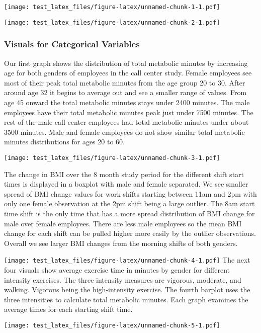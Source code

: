 \documentclass[]{article}
\begin{document}
\texttt{[image: test\_latex\_files/figure-latex/unnamed-chunk-1-1.pdf]}

\texttt{[image: test\_latex\_files/figure-latex/unnamed-chunk-2-1.pdf]}

\hypertarget{visuals-for-categorical-variables}{%
\subsubsection{Visuals for Categorical
Variables}\label{visuals-for-categorical-variables}}

Our first graph shows the distribution of total metabolic minutes by
increasing age for both genders of employees in the call center study.
Female employees see most of their peak total metabolic minutes from the
age group 20 to 30. After around age 32 it begins to average out and see
a smaller range of values. From age 45 onward the total metabolic
minutes stays under 2400 minutes. The male employees have their total
metabolic minutes peak just under 7500 minutes. The rest of the male
call center employees had total metabolic minutes under about 3500
minutes. Male and female employees do not show similar total metabolic
minutes distributions for ages 20 to 60.

\texttt{[image: test\_latex\_files/figure-latex/unnamed-chunk-3-1.pdf]}

The change in BMI over the 8 month study period for the different shift
start times is displayed in a boxplot with male and female separated. We
see smaller spread of BMI change values for work shifts starting between
11am and 2pm with only one female observation at the 2pm shift being a
large outlier. The 8am start time shift is the only time that has a more
spread distribution of BMI change for male over female employees. There
are less male employees so the mean BMI change for each shift can be
pulled higher more easily by the outlier observations. Overall we see
larger BMI changes from the morning shifts of both genders.

\texttt{[image: test\_latex\_files/figure-latex/unnamed-chunk-4-1.pdf]}
The next four visuals show average exercise time in minutes by gender
for different intensity exercises. The three intensity measures are
vigorous, moderate, and walking. Vigorous being the high-intensity
exercise. The fourth barplot uses the three intensities to calculate
total metabolic minutes. Each graph examines the average times for each
starting shift time.

\texttt{[image: test\_latex\_files/figure-latex/unnamed-chunk-5-1.pdf]}
\end{document}
